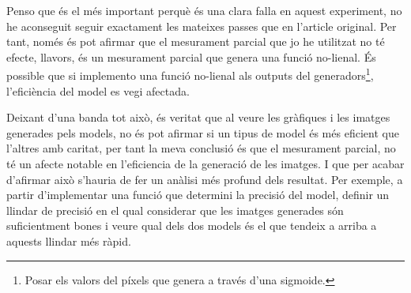 Penso que és el més important perquè és una clara falla en aquest experiment, no he aconseguit seguir exactament les mateixes passes que en l'article original. Per tant, només és pot afirmar que el mesurament parcial que jo he utilitzat no té efecte, llavors, és un mesurament parcial que genera una funció no-lienal. És possible que si implemento una funció no-lienal als outputs del generadors\footnote{Posar els valors del píxels que genera a través d'una sigmoide.}, l'eficiència del model es vegi afectada. 

Deixant d'una banda tot això, és veritat que al veure les gràfiques i les imatges generades pels models, no és pot afirmar si un tipus de model és més eficient que l'altres amb caritat, per tant la meva conclusió és que el mesurament parcial, no té un afecte notable en l'eficiencia de la generació de les imatges. I que per acabar d'afirmar això s'hauria de fer un anàlisi més profund dels resultat. Per exemple, a partir d'implementar una funció que determini la precisió del model, definir un llindar de precisió  en el qual considerar que les imatges generades són suficientment bones i veure qual dels dos models és el que tendeix a arriba a aquests llindar més ràpid.  

